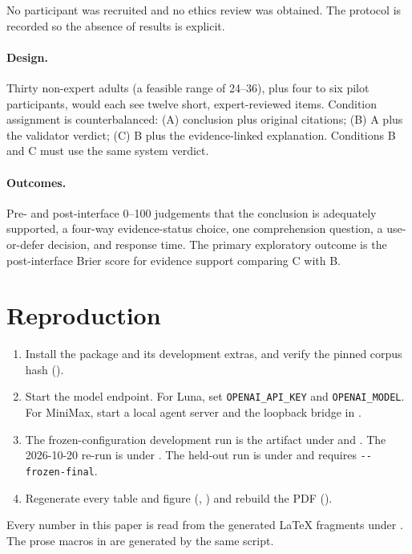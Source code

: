 \documentclass[11pt,a4paper]{article}
\begin{document}
No participant was recruited and no ethics review was obtained. The
protocol is recorded so the absence of results is explicit.

\paragraph{Design.} Thirty non-expert adults (a feasible range of
24--36), plus four to six pilot participants, would each see twelve
short, expert-reviewed items. Condition assignment is counterbalanced:
(A) conclusion plus original citations; (B) A plus the validator
verdict; (C) B plus the evidence-linked explanation. Conditions B and C
must use the same system verdict.

\paragraph{Outcomes.} Pre- and post-interface 0--100 judgements that
the conclusion is adequately supported, a four-way evidence-status
choice, one comprehension question, a use-or-defer decision, and
response time. The primary exploratory outcome is the post-interface
Brier score for evidence support comparing C with B.

\section{Reproduction}
\label{app:repro}

\begin{enumerate}
  \item Install the package and its development extras, and verify the
    pinned corpus hash ().
  \item Start the model endpoint. For Luna, set
    \texttt{OPENAI\_API\_KEY} and \texttt{OPENAI\_MODEL}. For MiniMax,
    start a local agent server and the loopback bridge in
    .
  \item The frozen-configuration development run is the artifact under
     and
    . The 2026-10-20 re-run is
    under . The held-out run is under
     and requires \texttt{-{}-frozen-final}.
  \item Regenerate every table and figure
    (,
    ) and rebuild the PDF
    ().
\end{enumerate}

Every number in this paper is read from the generated LaTeX fragments
under . The prose macros in
 are generated by the same script.



\end{document}

